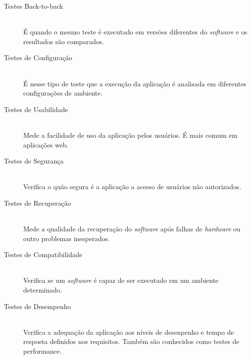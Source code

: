 
\begin{description}

\item[Testes Back-to-back] \hfill \\

É quando o mesmo teste é executado em versões diferentes do \textit{software} e os resultados são comparados.

\item[Testes de Configuração] \hfill \\

É nesse tipo de teste que a execução da aplicação é analisada em diferentes configurações de ambiente.

\item[Testes de Usabilidade] \hfill \\

Mede a facilidade de uso da aplicação pelos usuários. É mais comum em aplicações web.

\item[Testes de Segurança] \hfill \\

Verifica o quão segura é a aplicação a acesso de usuários não autorizados.

\item[Testes de Recuperação] \hfill \\

Mede a qualidade da recuperação do \textit{software} após falhas de \textit{hardware} ou outro problemas inesperados.

\item[Testes de Compatibilidade] \hfill \\

Verifica se um \textit{software} é capaz de ser executado em um ambiente determinado.

\item[Testes de Desempenho] \hfill \\

Verifica a adequação da aplicação aos níveis de desenpenho e tempo de resposta definidos nos requisitos. Também são conhecidos como testes de performance.

\end{description}



